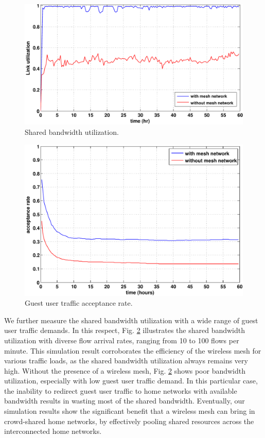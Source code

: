 \begin{figure}[h]
\begin{center}
\includegraphics[width=1\linewidth]{../../results/simulation/utilization.pdf}  
\caption{Shared bandwidth utilization.}
\label{fig:utilization}
\end{center}
\end{figure}

\begin{figure}[h]
\begin{center}
\includegraphics[width=1\linewidth]{../../results/simulation/acceptance_rate.pdf}  
\caption{Guest user traffic acceptance rate.}
\label{fig:acceptance}
\end{center}
\end{figure}

We further measure the shared bandwidth utilization with a wide range of guest user traffic demands. In this respect, Fig. \ref{fig:acceptance} illustrates the shared bandwidth utilization with diverse flow arrival rates, ranging from 10 to 100 flows per minute. This simulation result corroborates the efficiency of the wireless mesh for various traffic loads, as the shared bandwidth utilization always remains very high. Without the presence of a wireless mesh, Fig. \ref{fig:acceptance} shows poor bandwidth utilization, especially with low guest user traffic demand. In this particular case, the inability to redirect guest user traffic to home networks with available bandwidth results in wasting most of the shared bandwidth. Eventually, our simulation results show the significant benefit that a wireless mesh can bring in crowd-shared home networks, by effectively pooling shared resources across the interconnected home networks. 

